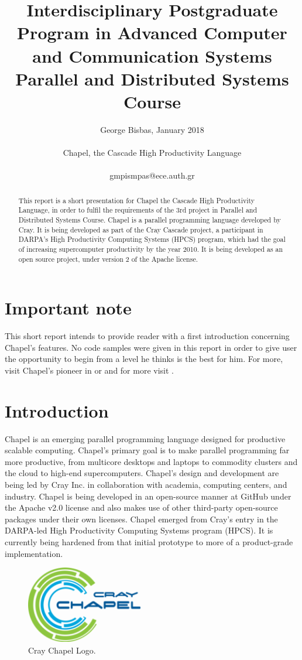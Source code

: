 \documentclass[letterpaper]{article}
\title{Interdisciplinary Postgraduate Program in Advanced Computer and Communication Systems\\
Parallel and Distributed Systems Course}
\author{George Bisbas, January 2018 \\
\mbox{}\\
Chapel, the Cascade High Productivity Language \\
\\
gmpismpas@ece.auth.gr}
\begin{document}
\maketitle

\begin{abstract}
This report is a short presentation for Chapel the Cascade High Productivity Language, in order to fulfil the requirements of the 3rd project in Parallel and Distributed Systems Course. Chapel is a parallel programming language developed by Cray. It is being developed as part of the Cray Cascade project, a participant in DARPA's High Productivity Computing Systems (HPCS) program, which had the goal of increasing supercomputer productivity by the year 2010. It is being developed as an open source project, under version 2 of the Apache license.
\end{abstract}

\section{Important note}
This short report intends to provide reader with a first introduction concerning Chapel's features.
No code samples were given in this report in order to give user the opportunity to begin from a level he thinks is the best for him. For more, visit Chapel's pioneer in \cite{Chamberlain2013} or \cite{Chamberlain2015} and for more visit \cite{Dun2012}.



\section{Introduction}

Chapel is an emerging parallel programming language designed for productive scalable computing. Chapel’s primary goal is to make parallel programming far more productive, from multicore desktops and laptops to commodity clusters and the cloud to high-end supercomputers. Chapel’s design and development are being led by Cray Inc. in collaboration with academia, computing centers, and industry.
Chapel is being developed in an open-source manner at GitHub under the Apache v2.0 license and also makes use of other third-party open-source packages under their own licenses. Chapel emerged from Cray’s entry in the DARPA-led High Productivity Computing Systems program (HPCS). It is currently being hardened from that initial prototype to more of a product-grade implementation.


\begin{figure}[!htb]
\begin{center}
\includegraphics[width=2in]{Cray_Chapel_Logo.png}
\caption{Cray Chapel Logo.}
\label{fig1}
\end{center}
\end{figure}
\end{document}
